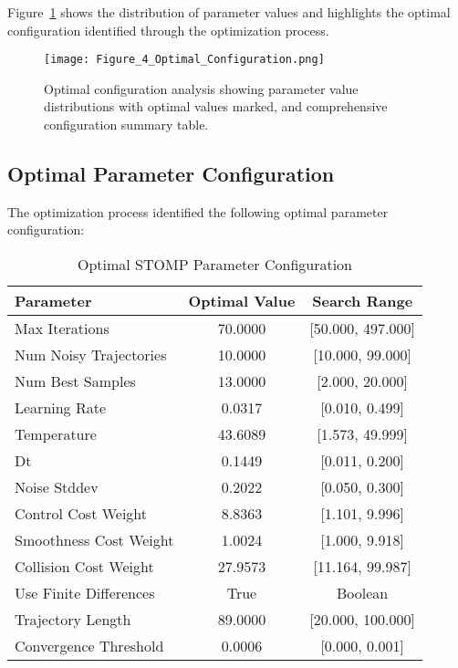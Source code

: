 \documentclass[12pt]{article}
\begin{document}
Figure~\ref{fig:optimal_configuration} shows the distribution of parameter values and highlights the optimal configuration identified through the optimization process.

\begin{figure}[H]
\centering
\texttt{[image: Figure\_4\_Optimal\_Configuration.png]}
\caption{Optimal configuration analysis showing parameter value distributions with optimal values marked, and comprehensive configuration summary table.}
\label{fig:optimal_configuration}
\end{figure}

\subsection{Optimal Parameter Configuration}

The optimization process identified the following optimal parameter configuration:

\begin{table}[H]
\centering
\caption{Optimal STOMP Parameter Configuration}
\label{tab:optimal_config}
\begin{tabular}{lcc}
\toprule
\textbf{Parameter} & \textbf{Optimal Value} & \textbf{Search Range} \\
\midrule
Max Iterations & 70.0000 & [50.000, 497.000] \\
Num Noisy Trajectories & 10.0000 & [10.000, 99.000] \\
Num Best Samples & 13.0000 & [2.000, 20.000] \\
Learning Rate & 0.0317 & [0.010, 0.499] \\
Temperature & 43.6089 & [1.573, 49.999] \\
Dt & 0.1449 & [0.011, 0.200] \\
Noise Stddev & 0.2022 & [0.050, 0.300] \\
Control Cost Weight & 8.8363 & [1.101, 9.996] \\
Smoothness Cost Weight & 1.0024 & [1.000, 9.918] \\
Collision Cost Weight & 27.9573 & [11.164, 99.987] \\
Use Finite Differences & True & Boolean \\
Trajectory Length & 89.0000 & [20.000, 100.000] \\
Convergence Threshold & 0.0006 & [0.000, 0.001] \\
\bottomrule
\end{tabular}
\end{table}
\end{document}
